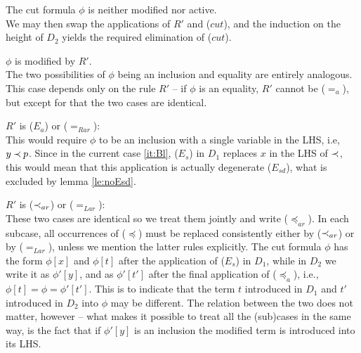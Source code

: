 \begin{PROOF}
\begin{LS}
\begin{LSA}
%
\item\label{it:cutneither} The cut formula $\phi$ is neither modified nor active.\\
We may then swap the
applications of $R'$ and ($cut$), and the induction on the height of $D_2$
yields the required elimination of ($cut$). 
%
\item\label{it:cutmodified}  $\phi$ is modified by $R'$.\\
The two possibilities of $\phi$ being an inclusion and equality are entirely 
analogous. This case depends only on the rule $R'$ -- if $\phi$ is an equality, 
$R'$ cannot be ($=_a$), but except for that the two cases are identical.
%
 \begin{LSB}
   \item $R'$ is ($E_a$) or ($=_{Rar}$): \\
  This would require $\phi$ to be an inclusion with  a single
   variable in the LHS, i.e, $y\mathbin{\prec} p$. %
Since in the current case \ref{it:Bl},
  ($E_s$) in $D_1$
   replaces $x$ in the LHS of $\mathbin{\prec}$, this would mean that this application is
   actually degenerate ($E_{sd}$), what is excluded by lemma \ref{le:noEsd}. 
  \item  $R'$ is ($\mathbin{\prec}_{ar}$) or ($=_{Lar}$): \\
  \noindent
   These two cases are identical so we treat them jointly and
  write ($\preceq_{ar}$). In each subcase, all occurrences of ($\preceq$) must be
  replaced consistently either by ($\mathbin{\prec}_{ar}$) or by ($=_{Lar}$), unless we
  mention the latter rules explicitly. The cut formula $\phi$ 
has the form $\phi[x]$ and $\phi[t]$ after the application of ($E_s$) in $D_1$, while in $D_2$ we 
write it as $\phi'[y]$, and as $\phi'[t']$ after the final application of ($\preceq_a$), i.e., 
 $\phi[t] = \phi = \phi'[t']$. This is to indicate that the term $t$ introduced in $D_1$ and
$t'$ introduced in $D_2$ into $\phi$ may be different. The relation between the two
 does not matter, however -- what makes it possible to treat all the (sub)cases in
the same way, is the fact that if $\phi'[y]$ is an inclusion the modified term is introduced into
its LHS.


\end{LSB}
\end{LSA}
\end{LS}
\end{PROOF}
